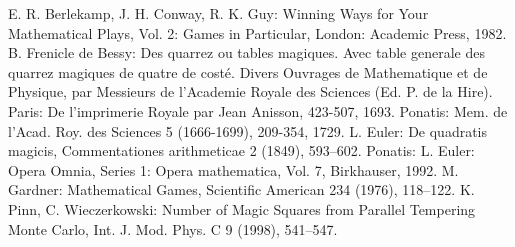 \documentclass[a4paper,12pt]{article}
\begin{document}

\begin{thebibliography}{99}

E. R. Berlekamp, J. H. Conway, R. K. Guy:
Winning Ways for Your Mathematical Plays,
Vol. 2: Games in Particular, London: Academic Press, 1982.
B. Frenicle de Bessy:
Des quarrez ou tables magiques. Avec table generale des quarrez magiques de quatre de costé.
Divers Ouvrages de Mathematique et de Physique, par Messieurs de l'Academie Royale des Sciences (Ed. P. de la Hire).
Paris: De l'imprimerie Royale par Jean Anisson, 423-507, 1693.
Ponatis: Mem. de l'Acad. Roy. des Sciences 5 (1666-1699), 209-354, 1729.
L. Euler:
De quadratis magicis,
Commentationes arithmeticae 2 (1849), 593--602.
Ponatis: L. Euler: Opera Omnia, Series 1: Opera mathematica, Vol. 7, Birkhauser, 1992.
M. Gardner:
Mathematical Games,
Scientific American 234 (1976), 118--122.
K. Pinn, C. Wieczerkowski:
Number of Magic Squares from Parallel Tempering Monte Carlo,
Int. J. Mod. Phys. C 9 (1998), 541--547.

\end{thebibliography}
\end{document}
